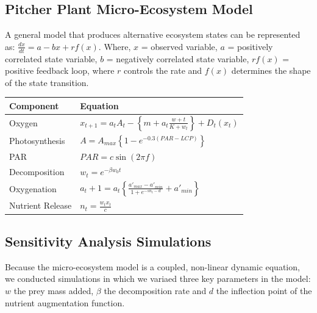 \documentclass[a0,landscape]{a0poster}
\begin{document}
\begin{multicols}{3}
\subsection*{Pitcher Plant Micro-Ecosystem Model}

A general model that produces alternative ecosystem states can be
represented as: $\frac{dx}{dt} = a - bx + r f(x)$. Where, $x$ =
observed variable, $a$ = positively correlated state variable, $b$ =
negatively correlated state variable, $rf(x)$ = positive feedback
loop, where $r$ controls the rate and $f(x)$ determines the shape of
the state transition.


\begin{center}\vspace{1cm}
\begin{tabular}{l l}
\toprule
\textbf{Component} & Equation \\
\midrule
Oxygen & $x_{t+1} = a_t A_t - \left\{m + a_t \frac{w+t}{K + w_t}\right\} + D_t(x_t)$ \\
Photosynthesis & $  A = A_{max} \left\{ 1 - e^{-0.3 (PAR - LCP)} \right\} $\\
PAR & $PAR = c \sin(2 \pi f)$\\
Decomposition & $w_t = e^{-\beta w_0 t}$\\
Oxygenation & $a_t+1 = a_t \left\{ \frac{a'_{max}-a'_{min}}{1+e^{-s n_t - d}} + a'_{min}\right\}$ \\
Nutrient Release & $n_t = \frac{w_t x_t}{c}$ \\
\bottomrule
\end{tabular}
\end{center}\vspace{1cm}

\subsection*{Sensitivity Analysis Simulations}

Because the micro-ecosystem model is a coupled, non-linear dynamic
equation, we conducted simulations in which we variaed three key
parameters in the model: $w$ the prey mass added, $\beta$ the
decomposition rate and $d$ the inflection point of the nutrient
augmentation function. 



\end{multicols}
\end{document}
